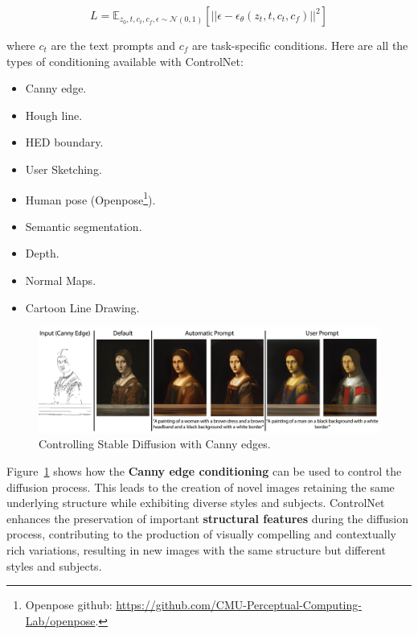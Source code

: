 \documentclass[preprint]{elsarticle}
\begin{document}
\begin{equation}
	L = \mathbb{E}_{z_0,t,c_t,c_f,\epsilon \sim \mathcal{N}(0,1)}\left[||\epsilon-\epsilon_\theta(z_t,t,c_t,c_f)||^2 \right]
\end{equation}

where $c_t$ are the text prompts and $c_f$ are task-specific conditions. Here are all the types of conditioning available with ControlNet:

\begin{itemize}
	\item Canny edge.
	\item Hough line.
	\item HED boundary.
	\item User Sketching.
	\item Human pose (Openpose\footnote{Openpose github: \url{https://github.com/CMU-Perceptual-Computing-Lab/openpose}.}).
	\item Semantic segmentation.
	\item Depth.
	\item Normal Maps.
	\item Cartoon Line Drawing.
\end{itemize}

\begin{figure}[t]
	\centering
	\includegraphics[scale=0.8]{img/background_img/ControlnetDemo.png}
	\caption{Controlling Stable Diffusion with Canny edges.}
	\label{fig:canny}
\end{figure}

Figure~\ref{fig:canny} shows how the \textbf{Canny edge conditioning} can be used to control the diffusion process.
This leads to the creation of novel images retaining the same underlying structure while exhibiting diverse styles and subjects.
ControlNet enhances the preservation of important \textbf{structural features} during the diffusion process, contributing to the production of visually compelling and contextually rich variations, resulting in new images with the same structure but different styles and subjects.
\end{document}
